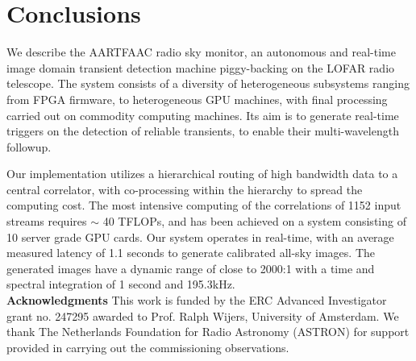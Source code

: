 \documentclass{ws-jai}
\begin{document}

\section {\label{sec:conclusion} Conclusions}
We describe  the AARTFAAC radio sky  monitor, an autonomous and  real-time image
domain   transient  detection   machine   piggy-backing  on   the  LOFAR   radio
telescope.  The  system consists  of  a  diversity of  heterogeneous  subsystems
ranging from FPGA firmware, to heterogeneous GPU machines, with final processing
carried out on  commodity computing machines.  Its aim is  to generate real-time
triggers   on  the   detection   of  reliable   transients,   to  enable   their
multi-wavelength followup.

Our implementation utilizes  a hierarchical routing of high bandwidth  data to a
central  correlator,  with co-processing  within  the  hierarchy to  spread  the
computing cost.  The most intensive computing  of the correlations of 1152 input
streams requires $\sim$ 40 TFLOPs, and  has been achieved on a system consisting
of 10 server grade GPU cards.  Our system operates in real-time, with an average
measured  latency of  1.1 seconds  to  generate calibrated  all-sky images.  The
generated  images have  a dynamic  range  of close  to  2000:1 with  a time  and
spectral integration of 1 second  and 195.3kHz.\\


\noindent  \textbf{Acknowledgments} This  work  is funded  by  the ERC  Advanced
Investigator  grant no.  247295 awarded  to Prof.   Ralph Wijers,  University of
Amsterdam.  We thank The Netherlands Foundation for Radio Astronomy (ASTRON) for
support provided in carrying out the commissioning observations.



\end{document}
